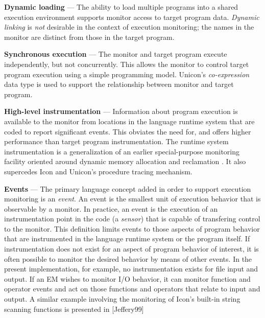 \begin{list}{}{\itemsep 7pt}
\item [{\bf Dynamic loading}] --- The ability to load multiple programs
	into a shared execution environment supports
	monitor access to target program data.
	{\em Dynamic linking\/} is {\em not\/} desirable in the
	context of execution monitoring; the names in the
	monitor are distinct from those in the target program. 
\item [{\bf Synchronous execution}] --- The monitor and target program execute
	independently, but not concurrently.  This allows the monitor
	to control target program execution using a simple programming model.
	Unicon's {\em co-expression\/} data type is used to support the
	relationship between monitor and target program.
\item [{\bf High-level instrumentation}] --- Information
	about program execution is available to the monitor from
	locations in the language runtime system that are coded to report
	significant events.  This obviates the need for, and
	offers higher performance than target program
	instrumentation.  The runtime system instrumentation is a
	generalization of an earlier special-purpose
	monitoring facility oriented around dynamic memory allocation
	and reclamation \cite{Town89}.
	It also supercedes Icon and Unicon's procedure
	tracing mechanism.
\item [{\bf Events}] --- 
	The primary language concept added in order to support execution
	monitoring is an {\em event\/}.  An event is the smallest unit of
	execution behavior that is observable by a monitor.  In practice, an
	event is the execution of an instrumentation point in the code
	(a {\em sensor\/}) 
	that is capable of transfering control to the monitor.
	This definition limits events to those aspects of program behavior
	that are instrumented in the language runtime system or the program
	itself. If instrumentation
	does not exist for an aspect of program behavior of interest, it is
	often possible to monitor the desired behavior by means of other
	events. In the present implementation, for example, no instrumentation
	exists for file input and output.  If an EM wishes to monitor I/O
	behavior, it can monitor function and operator events and act on
	those functions and operators that relate to input and output.
	A similar example involving the monitoring of Icon's built-in
	string scanning functions is presented in [Jeffery99]


\end{list}
